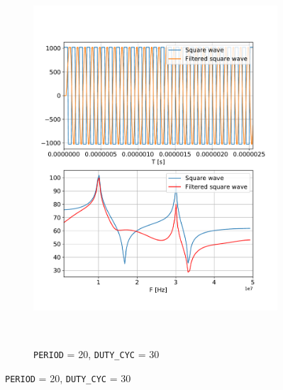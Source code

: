 \documentclass[a4paper,11pt]{article}
\begin{document}
\begin{figure}[H]
\begin{subfigure}{0.49\textwidth}
      \includegraphics[width=1\linewidth]{./Figure/P10_D50.pdf}
    \end{subfigure}
    \\
    \begin{subfigure}{0.49\textwidth}
      \caption{\texttt{PERIOD} = 20, \texttt{DUTY\_CYC} = 30}

\end{subfigure}
\end{figure}
\end{document}

